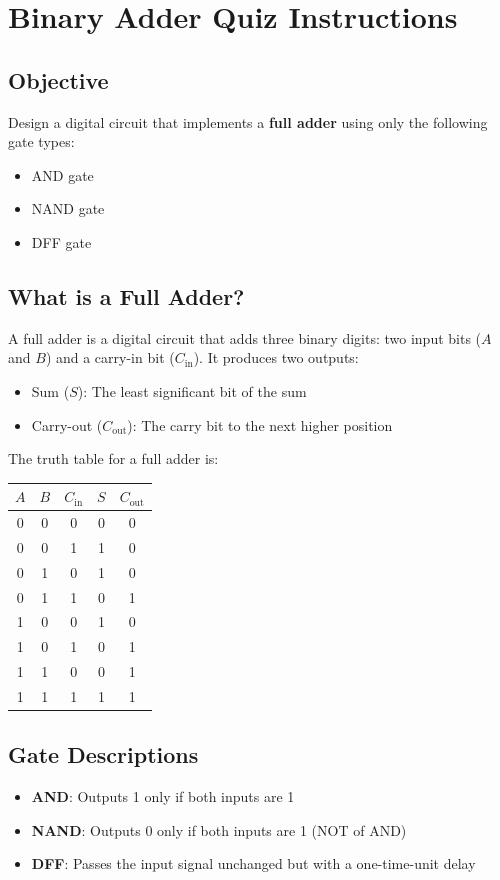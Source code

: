 \section*{Binary Adder Quiz Instructions}

\subsection*{Objective}
Design a digital circuit that implements a \textbf{full adder} using only the following gate types:
\begin{itemize}
  \item AND gate
  \item NAND gate
  \item DFF gate
\end{itemize}

\subsection*{What is a Full Adder?}
A full adder is a digital circuit that adds three binary digits: two input bits ($A$ and $B$) and a carry-in bit ($C_{\text{in}}$). It produces two outputs:
\begin{itemize}
  \item Sum ($S$): The least significant bit of the sum
  \item Carry-out ($C_{\text{out}}$): The carry bit to the next higher position
\end{itemize}

The truth table for a full adder is:
\begin{center}
\begin{tabular}{|c|c|c|c|c|}
\hline
$A$ & $B$ & $C_{\text{in}}$ & $S$ & $C_{\text{out}}$ \\
\hline
0 & 0 & 0 & 0 & 0 \\
0 & 0 & 1 & 1 & 0 \\
0 & 1 & 0 & 1 & 0 \\
0 & 1 & 1 & 0 & 1 \\
1 & 0 & 0 & 1 & 0 \\
1 & 0 & 1 & 0 & 1 \\
1 & 1 & 0 & 0 & 1 \\
1 & 1 & 1 & 1 & 1 \\
\hline
\end{tabular}
\end{center}

\subsection*{Gate Descriptions}
\begin{itemize}
  \item \textbf{AND}: Outputs 1 only if both inputs are 1
  \item \textbf{NAND}: Outputs 0 only if both inputs are 1 (NOT of AND)
  \item \textbf{DFF}: Passes the input signal unchanged but with a one-time-unit delay
\end{itemize}

